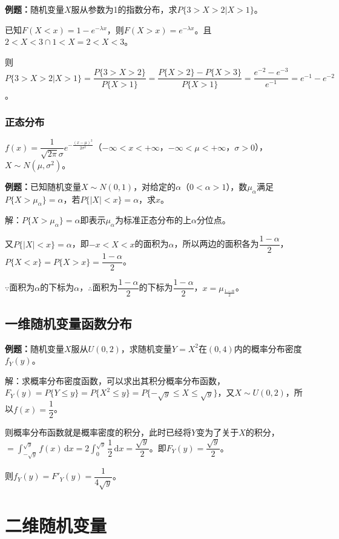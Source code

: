 \documentclass[UTF8, 12pt]{ctexart}
\begin{document}
\textbf{例题：}随机变量$X$服从参数为1的指数分布，求$P\{3>X>2|X>1\}$。

已知$F(X<x)=1-e^{-\lambda x}$，则$F(X>x)=e^{-\lambda x}$。且$2<X<3\cap 1<X=2<X<3$。

则$P\{3>X>2|X>1\}=\dfrac{P\{3>X>2\}}{P\{X>1\}}=\dfrac{P\{X>2\}-P\{X>3\}}{P\{X>1\}}=\dfrac{e^{-2}-e^{-3}}{e^{-1}}=e^{-1}-e^{-2}$。

\subsubsection{正态分布}

$f(x)=\dfrac{1}{\sqrt{2\pi}\sigma}e^{-\frac{(x-\mu)^2}{2\sigma^2}}$（$-\infty<x<+\infty$，$-\infty<\mu<+\infty$，$\sigma>0$），$X\sim N(\mu,\sigma^2)$。

\textbf{例题：}已知随机变量$X\sim N(0,1)$，对给定的$\alpha$（$0<\alpha>1$），数$\mu_\alpha$满足$P\{X>\mu_\alpha\}=\alpha$，若$P\{\vert X\vert<x\}=\alpha$，求$x$。

解：$P\{X>\mu_\alpha\}=\alpha$即表示$\mu_\alpha$为标准正态分布的上$\alpha$分位点。

又$P\{\vert X\vert<x\}=\alpha$，即$-x<X<x$的面积为$\alpha$，所以两边的面积各为$\dfrac{1-\alpha}{2}$，$P\{X<x\}=P\{X>x\}=\dfrac{1-\alpha}{2}$。

$\because$面积为$\alpha$的下标为$\alpha$，$\therefore$面积为$\dfrac{1-\alpha}{2}$的下标为$\dfrac{1-\alpha}{2}$，$x=\mu_\frac{1-\alpha}{2}$。

\subsection{一维随机变量函数分布}

\textbf{例题：}随机变量$X$服从$U(0,2)$，求随机变量$Y=X^2$在$(0,4)$内的概率分布密度$f_Y(y)$。

解：求概率分布密度函数，可以求出其积分概率分布函数，$F_Y(y)=P\{Y\leqslant y\}=P\{X^2\leqslant y\}=P\{-\sqrt{y}\leqslant X\leqslant\sqrt{y}\}$，又$X\sim U(0,2)$，所以$f(x)=\dfrac{1}{2}$。

则概率分布函数就是概率密度的积分，此时已经将$Y$变为了关于$X$的积分，$=\int_{-\sqrt{y}}^{\sqrt{y}}f(x)\,\textrm{d}x=$$\displaystyle{2\int_0^{\sqrt{y}}\dfrac{1}{2}\,\textrm{d}x}=\dfrac{\sqrt{y}}{2}$。即$F_Y(y)=\dfrac{\sqrt{y}}{2}$。

则$f_Y(y)=F'_Y(y)=\dfrac{1}{4\sqrt{y}}$。

\section{二维随机变量}
\end{document}
